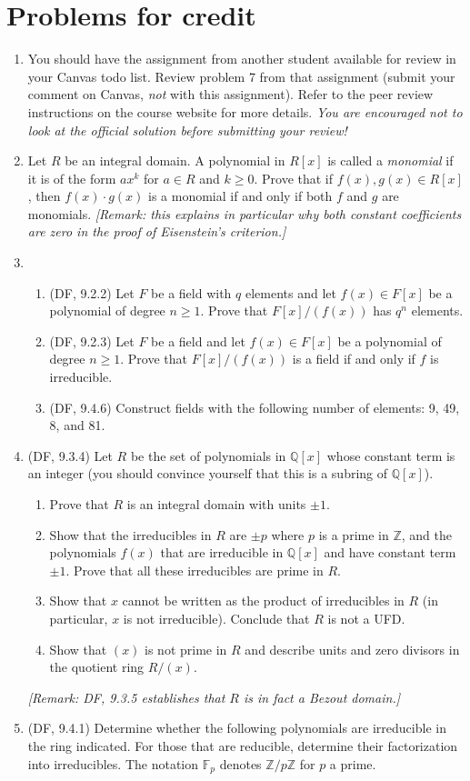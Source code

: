 \documentclass{amsart}
\theoremstyle{definition}
\newcommand{\Zz}{\mathbb{Z}}
\newcommand{\Qq}{\mathbb{Q}}
\newcommand{\Ff}{\mathbb{F}}
\begin{document}
\section*{Problems for credit}

\begin{enumerate}
\item You should have the assignment from another student available for review in your Canvas todo list. Review problem 7 from that assignment (submit your comment on Canvas, \emph{not} with this assignment). Refer to the peer review instructions on the course website for more details. \emph{You are encouraged not to look at the official solution before submitting your review!}
\item Let $R$ be an integral domain. A polynomial in $R[x]$ is called a \emph{monomial} if it is of the form $a x^k$ for $a \in R$ and $k \ge 0$. Prove that if $f(x), g(x) \in R[x]$, then $f(x) \cdot g (x)$ is a monomial if and only if both $f$ and $g$ are monomials. \emph{[Remark: this explains in particular why both constant coefficients are zero in the proof of Eisenstein's criterion.]}
\item \begin{enumerate}
\item (DF, 9.2.2) Let $F$ be a field with $q$ elements and let $f (x) \in F[x]$ be a polynomial of degree $n \ge 1$. Prove that $F[x] / (f (x))$ has $q^n$ elements.
\item (DF, 9.2.3) Let $F$ be a field and let $f (x) \in F[x]$ be a polynomial of degree $n \ge 1$. Prove that $F[x] / (f (x))$ is a field if and only if $f$ is irreducible.
\item (DF, 9.4.6) Construct fields with the following number of elements: 9, 49, 8, and 81.
\end{enumerate}
\item (DF, 9.3.4) Let $R$ be the set of polynomials in $\Qq[x]$ whose constant term is an integer (you should convince yourself that this is a subring of $\Qq[x]$).
  \begin{enumerate}
  \item Prove that $R$ is an integral domain with units $\pm 1$.
  \item Show that the irreducibles in $R$ are $\pm p$ where $p$ is a prime in $\Zz$, and the polynomials $f(x)$ that are irreducible in $\Qq[x]$ and have constant term $\pm 1$. Prove that all these irreducibles are prime in $R$.
  \item Show that $x$ cannot be written as the product of irreducibles in $R$ (in particular, $x$ is not irreducible). Conclude that $R$ is not a UFD.
  \item Show that $(x)$ is not prime in $R$ and describe units and zero divisors in the quotient ring $R / (x)$.
  \end{enumerate}
  \emph{[Remark: DF, 9.3.5 establishes that $R$ is in fact a Bezout domain.]}
\item (DF, 9.4.1) Determine whether the following polynomials are irreducible in the ring indicated. For those that are reducible, determine their factorization into irreducibles. The notation $\Ff_p$ denotes $\Zz / p \Zz$ for $p$ a prime.


\end{enumerate}
\end{document}
